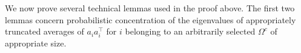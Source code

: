 \documentclass[12pt]{article}
\newcommand{\1}{\mathbbm{1}}
\newcommand{\floor}[1]{\lfloor #1 \rfloor}
\newcommand{\Omegac}{\Omega^c}
\newcommand{\eps}{\varepsilon}
\newtheorem{lemma}[theorem]{Lemma}
\begin{document}
We now prove several technical lemmas used in the proof above.  The first two lemmas concern probabilistic concentration of the eigenvalues of appropriately truncated averages of $a_i a_i^\intercal$ for $i$ belonging to an arbitrarily selected $\Omegac$ of appropriate size. 


\end{document}
